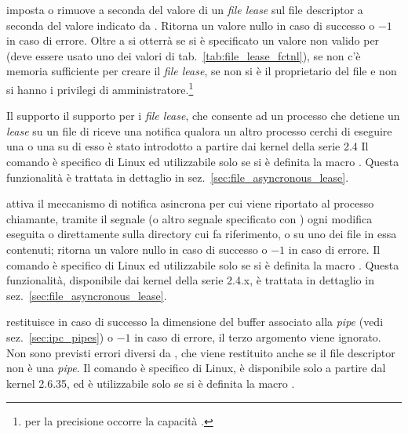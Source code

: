 \begin{basedescript}{\desclabelwidth{1.8cm}}
\item[\constd{F\_SETLEASE}] imposta o rimuove a seconda del valore
  di  un \textit{file lease} sul file descriptor  a seconda
  del valore indicato da . Ritorna un valore nullo in caso di
  successo o $-1$ in caso di errore. Oltre a  si otterrà
   se si è specificato un valore non valido per 
  (deve essere usato uno dei valori di tab.~\ref{tab:file_lease_fctnl}),
   se non c'è memoria sufficiente per creare il \textit{file
    lease},  se non si è il proprietario del file e non si
  hanno i privilegi di amministratore.\footnote{per la precisione occorre la
    capacità .}

  Il supporto il supporto per i \textit{file lease}, che consente ad un
  processo che detiene un \textit{lease} su un file di riceve una notifica
  qualora un altro processo cerchi di eseguire una  o una
   su di esso è stato introdotto a partire dai kernel della
  serie 2.4 Il comando è specifico di Linux ed utilizzabile solo se si è
  definita la macro . Questa funzionalità è trattata in
  dettaglio in sez.~\ref{sec:file_asyncronous_lease}.

\item[\constd{F\_NOTIFY}] attiva il meccanismo di notifica asincrona per cui
  viene riportato al processo chiamante, tramite il segnale  (o
  altro segnale specificato con ) ogni modifica eseguita o
  direttamente sulla directory cui  fa riferimento, o su uno dei file
  in essa contenuti; ritorna un valore nullo in caso di successo o $-1$ in
  caso di errore. Il comando è specifico di Linux ed utilizzabile solo se si è
  definita la macro .  Questa funzionalità, disponibile
  dai kernel della serie 2.4.x, è trattata in dettaglio in
  sez.~\ref{sec:file_asyncronous_lease}.

\item[\constd{F\_GETPIPE\_SZ}] restituisce in caso di successo la dimensione
  del buffer associato alla \textit{pipe}  (vedi
  sez.~\ref{sec:ipc_pipes}) o $-1$ in caso di errore, il terzo argomento viene
  ignorato. Non sono previsti errori diversi da , che viene
  restituito anche se il file descriptor non è una \textit{pipe}. Il comando è
  specifico di Linux, è disponibile solo a partire dal kernel 2.6.35, ed è
  utilizzabile solo se si è definita la macro .


\end{basedescript}

